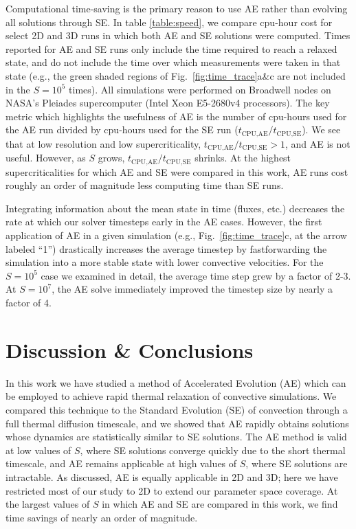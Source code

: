\documentclass[aps, pre, onecolumn, nofootinbib, notitlepage, groupedaddress, amsfonts, amssymb, amsmath, longbibliography]{revtex4-1}
\begin{document}
Computational time-saving is the primary reason to use AE rather than 
evolving all solutions through SE.
In table 
\ref{table:speed}, we compare cpu-hour cost for select
2D and 3D runs in which both AE and SE solutions were computed. Times reported
for AE and SE runs only include the time required to reach a relaxed
state, and do not include the time over which measurements were taken
in that state (e.g., the green shaded regions of
Fig.~\ref{fig:time_trace}a\&c are not included in the $S = 10^5$ times).
All simulations
were performed on Broadwell nodes on NASA's Pleiades supercomputer 
(Intel Xeon E5-2680v4 processors). The key metric which highlights the usefulness
of AE is the number of cpu-hours used for the AE run divided by cpu-hours used
for the SE run ($t_{\text{CPU,AE}}/t_{\text{CPU,SE}}$). We see that at low
resolution and low supercriticality, $t_{\text{CPU,AE}}/t_{\text{CPU,SE}} > 1$,
and AE is not useful. However, as $S$ grows, $t_{\text{CPU,AE}}/t_{\text{CPU,SE}}$
shrinks. At the highest supercriticalities for which AE and SE were compared
in this work, AE runs cost roughly an order of magnitude less computing time 
than SE runs.

Integrating information about the mean state in time (fluxes, etc.)
decreases the rate at which our solver timesteps early in the AE cases. 
However, 
the first application of AE in a given simulation 
(e.g., Fig.~\ref{fig:time_trace}c, at the arrow labeled ``1'') drastically
increases the average timestep by fastforwarding the simulation into
a more stable state with lower convective velocities. 
For the $S = 10^5$ case we examined in detail, the
average time step grew by a factor of 2-3.
At $S = 10^7$, the AE solve immediately improved the timestep size 
by nearly a factor of 4.




\newpage
\section{Discussion \& Conclusions}
\label{sec:extensions}
In this work we have studied a method of Accelerated Evolution (AE) which can
be employed to achieve rapid thermal relaxation of convective simulations.  We compared
this technique to the Standard Evolution (SE) of convection through a full thermal diffusion timescale,
and we
showed that AE rapidly obtains solutions whose dynamics are statistically similar to SE solutions.
The AE method is valid at low values of $S$, where SE solutions
converge quickly due to the short thermal timescale, and AE remains applicable
at high values of $S$, where SE solutions are intractable.
As discussed, AE is equally applicable in 2D and 3D; here we have restricted most of our study to 2D
to extend our parameter space coverage.
At the largest values of $S$ in which AE and SE are compared in this work, we find
time savings of nearly an order of magnitude. 
\end{document}
